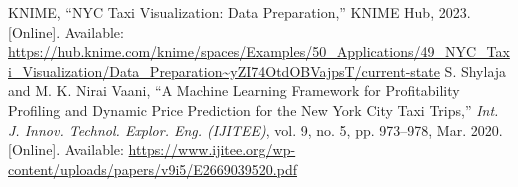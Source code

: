 \documentclass[conference]{IEEEtran}
\begin{document}
\begin{thebibliography}{15}
KNIME, ``NYC Taxi Visualization: Data Preparation,'' KNIME Hub, 2023. [Online]. Available: \url{https://hub.knime.com/knime/spaces/Examples/50_Applications/49_NYC_Taxi_Visualization/Data_Preparation~yZI74OtdOBVajpsT/current-state}
S. Shylaja and M. K. Nirai Vaani, ``A Machine Learning Framework for Profitability Profiling and Dynamic Price Prediction for the New York City Taxi Trips,'' \textit{Int. J. Innov. Technol. Explor. Eng. (IJITEE)}, vol. 9, no. 5, pp. 973--978, Mar. 2020. [Online]. Available: \url{https://www.ijitee.org/wp-content/uploads/papers/v9i5/E2669039520.pdf}
\end{thebibliography}
\end{document}
